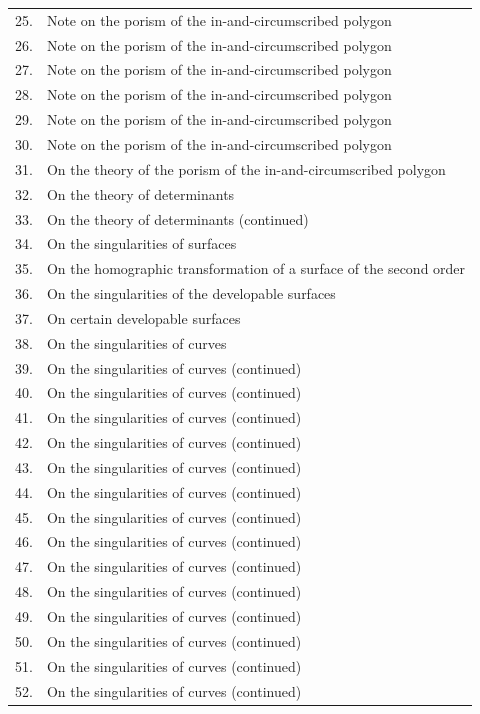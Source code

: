 \documentclass[11pt,a4paper]{article}
\begin{document}
\begin{longtable}{rp{}}
25. & Note on the porism of the in-and-circumscribed polygon \\
26. & Note on the porism of the in-and-circumscribed polygon \\
27. & Note on the porism of the in-and-circumscribed polygon \\
28. & Note on the porism of the in-and-circumscribed polygon \\
29. & Note on the porism of the in-and-circumscribed polygon \\
30. & Note on the porism of the in-and-circumscribed polygon \\
31. & On the theory of the porism of the in-and-circumscribed polygon \\
32. & On the theory of determinants \\
33. & On the theory of determinants (continued) \\
34. & On the singularities of surfaces \\
35. & On the homographic transformation of a surface of the second order \\
36. & On the singularities of the developable surfaces \\
37. & On certain developable surfaces \\
38. & On the singularities of curves \\
39. & On the singularities of curves (continued) \\
40. & On the singularities of curves (continued) \\
41. & On the singularities of curves (continued) \\
42. & On the singularities of curves (continued) \\
43. & On the singularities of curves (continued) \\
44. & On the singularities of curves (continued) \\
45. & On the singularities of curves (continued) \\
46. & On the singularities of curves (continued) \\
47. & On the singularities of curves (continued) \\
48. & On the singularities of curves (continued) \\
49. & On the singularities of curves (continued) \\
50. & On the singularities of curves (continued) \\
51. & On the singularities of curves (continued) \\
52. & On the singularities of curves (continued) \\

\end{longtable}
\end{document}
